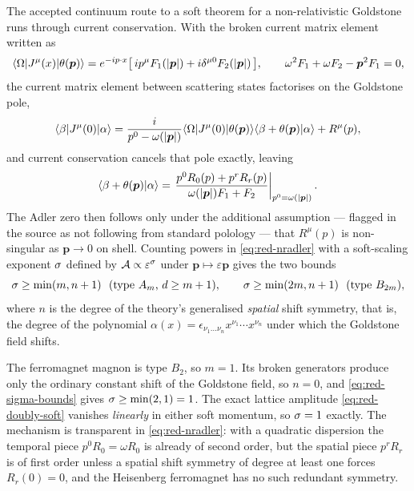 The accepted continuum route to a soft theorem for a non-relativistic Goldstone
runs through current conservation. With the broken current matrix element
written as
\begin{equation}
  \langle \Omega|J^{\mu}(x)|\theta(\bm p)\rangle
  =e^{-ip\cdot x}\bigl[\,ip^{\mu}F_1(\lvert \bm p\rvert)+i\delta^{\mu0}F_2(\lvert \bm p\rvert)\,\bigr],
  \qquad
  \omega^2F_1+\omega F_2-\bm{p}^2F_1=0,
\end{equation}
the current matrix element between scattering states factorises on the Goldstone
pole,
\begin{equation}
  \langle \beta|J^{\mu}(0)|\alpha\rangle
  =\frac{i}{p^0-\omega(\lvert \bm p\rvert)}
   \langle \Omega|J^{\mu}(0)|\theta(\bm p)\rangle\langle \beta+\theta(\bm p)|\alpha\rangle
   +R^{\mu}(p),
\end{equation}
and current conservation cancels that pole exactly, leaving
\begin{equation}
  \langle \beta+\theta(\bm p)|\alpha\rangle
  =\left.\frac{p^0R_0(p)+p^rR_r(p)}{\omega(\lvert \bm p\rvert)F_1+F_2}\right|_{p^0=\omega(\lvert \bm p\rvert)} .
  \label{eq:red-nradler}
\end{equation}
The Adler zero then follows only under the additional assumption --- flagged in
the source as not following from standard polology --- that $R^\mu(p)$ is
non-singular as $\bm p\to0$ on shell. Counting powers in
\eqref{eq:red-nradler} with a soft-scaling exponent $\sigma$ defined by
$\mathcal{A}\propto\varepsilon^{\sigma}$ under $\bm p\mapsto\varepsilon\bm p$
gives the two bounds
\begin{equation}
  \sigma\ge\min(m,n+1)\ \ \text{(type $A_m$, $d\ge m+1$)},
  \qquad
  \sigma\ge\min(2m,n+1)\ \ \text{(type $B_{2m}$)},
  \label{eq:red-sigma-bounds}
\end{equation}
where $n$ is the degree of the theory's generalised \emph{spatial} shift
symmetry, that is, the degree of the polynomial
$\alpha(x)=\epsilon_{\nu_1\dots\nu_n}x^{\nu_1}\cdots x^{\nu_n}$ under which the
Goldstone field shifts.

The ferromagnet magnon is type $B_2$, so $m=1$. Its broken generators produce
only the ordinary constant shift of the Goldstone field, so $n=0$, and
\eqref{eq:red-sigma-bounds} gives $\sigma\ge\min(2,1)=1$. The exact lattice
amplitude \eqref{eq:red-doubly-soft} vanishes \emph{linearly} in either soft
momentum, so $\sigma=1$ exactly. The mechanism is transparent in
\eqref{eq:red-nradler}: with a quadratic dispersion the temporal piece
$p^0R_0=\omega R_0$ is already of second order, but the spatial piece
$p^rR_r$ is of first order unless a spatial shift symmetry of degree at least
one forces $R_r(0)=0$, and the Heisenberg ferromagnet has no such redundant
symmetry.

